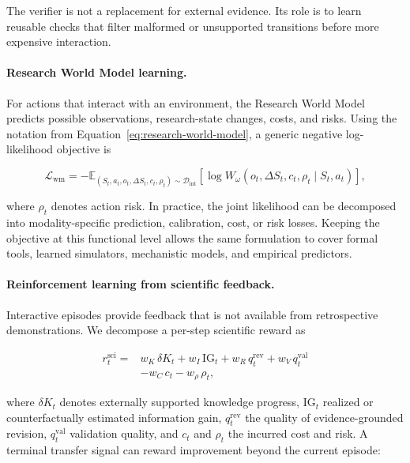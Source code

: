 \documentclass[11pt, a4paper, copyright]{google}
\begin{document}
The verifier is not a replacement for external evidence. Its role is to learn reusable checks that filter malformed or unsupported transitions before more expensive interaction.

\paragraph{Research World Model learning.}
For actions that interact with an environment, the Research World Model predicts possible observations, research-state changes, costs, and risks. Using the notation from Equation~\ref{eq:research-world-model}, a generic negative log-likelihood objective is

\begin{equation}
\mathcal{L}_{\mathrm{wm}}
=
-\mathbb{E}_{(S_t,a_t,o_t,\Delta S_t,c_t,\rho_t)\sim\mathcal{D}_{\mathrm{int}}}
\left[
\log W_{\omega}
\left(
 o_t,\Delta S_t,c_t,\rho_t
 \mid S_t,a_t
\right)
\right],
\label{eq:research-world-model-loss}
\end{equation}

where $\rho_t$ denotes action risk. In practice, the joint likelihood can be decomposed into modality-specific prediction, calibration, cost, or risk losses. Keeping the objective at this functional level allows the same formulation to cover formal tools, learned simulators, mechanistic models, and empirical predictors.

\paragraph{Reinforcement learning from scientific feedback.}
Interactive episodes provide feedback that is not available from retrospective demonstrations. We decompose a per-step scientific reward as

\begin{equation}
\begin{aligned}
r_t^{\mathrm{sci}}
={}&
 w_K\,\delta K_t
+w_I\,\mathrm{IG}_t
+w_R\,q_t^{\mathrm{rev}}
+w_V\,q_t^{\mathrm{val}}
\\
&-w_C\,c_t
-w_{\rho}\,\rho_t,
\end{aligned}
\label{eq:scientific-step-reward}
\end{equation}

where $\delta K_t$ denotes externally supported knowledge progress, $\mathrm{IG}_t$ realized or counterfactually estimated information gain, $q_t^{\mathrm{rev}}$ the quality of evidence-grounded revision, $q_t^{\mathrm{val}}$ validation quality, and $c_t$ and $\rho_t$ the incurred cost and risk. A terminal transfer signal can reward improvement beyond the current episode:
\end{document}
